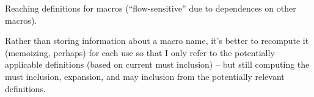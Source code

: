 \documentclass[10pt]{article}
\begin{document}
          
Reaching definitions for macros (``flow-sensitive'' due to
dependences on other macros).

Rather than storing information about a macro name, it's better to
recompute it (memoizing, perhaps) for each use so that I only refer to the
potentially applicable definitions (based on current must inclusion) -- but
still computing the must inclusion, expansion, and may inclusion from the
potentially relevant definitions.  



{\small }
\end{document}
